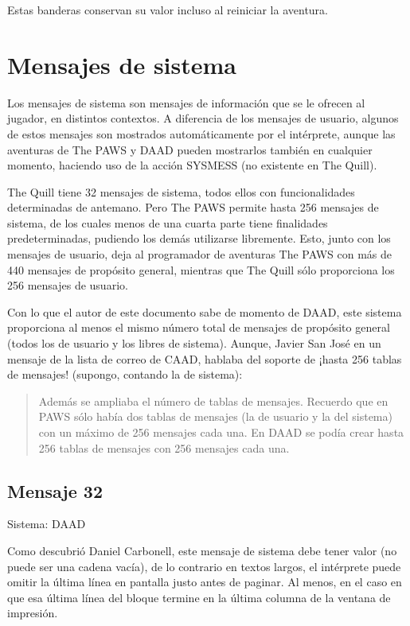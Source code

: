 \documentclass[11pt, a5paper]{article}
\newcommand{\quill}{\textsf{The Quill}\xspace}
\newcommand{\paw}{\textsf{The PAWS}\xspace}
\newcommand{\daad}{\textsf{DAAD}\xspace}
\newcommand{\sistema}[1]{\noindent Sistema: #1 \nopagebreak}
\begin{document}
Estas banderas conservan su valor incluso al reiniciar la aventura.


\section{Mensajes de sistema}

Los mensajes de sistema son mensajes de información que se le ofrecen al jugador, en distintos contextos. A diferencia de los mensajes de usuario, algunos de estos mensajes son mostrados automáticamente por el intérprete, aunque las aventuras de \paw y \daad pueden mostrarlos también en cualquier momento, haciendo uso de la acción SYSMESS (no existente en \quill).

\quill tiene 32 mensajes de sistema, todos ellos con funcionalidades determinadas de antemano. Pero \paw permite hasta 256 mensajes de sistema, de los cuales menos de una cuarta parte tiene finalidades predeterminadas, pudiendo los demás utilizarse libremente. Esto, junto con los mensajes de usuario, deja al programador de aventuras \paw con más de 440 mensajes de propósito general, mientras que \quill sólo proporciona los 256 mensajes de usuario.

Con lo que el autor de este documento sabe de momento de \daad, este sistema proporciona al menos el mismo número total de mensajes de propósito general (todos los de usuario y los libres de sistema). Aunque, Javier San José en un mensaje \cite{JSJ} de la lista de correo de CAAD, hablaba del soporte de ¡hasta 256 tablas de mensajes! (supongo, contando la de sistema):

\begin{quote}
\guillemotleft Además se ampliaba el número de tablas de mensajes. Recuerdo que en PAWS sólo había dos tablas de mensajes (la de usuario y la del sistema) con un máximo de 256 mensajes cada una. En \daad se podía crear hasta 256 tablas de mensajes con 256 mensajes cada una.\guillemotright
\end{quote}

\subsection{Mensaje 32}

\sistema{\daad}

Como descubrió Daniel Carbonell, este mensaje de sistema debe tener valor (no puede ser una cadena vacía), de lo contrario en textos largos, el intérprete puede omitir la última línea en pantalla justo antes de paginar. Al menos, en el caso en que esa última línea del bloque termine en la última columna de la ventana de impresión.
\end{document}
